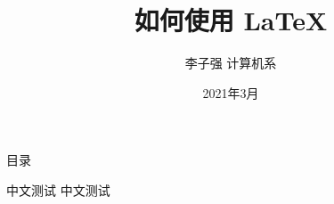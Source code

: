 \documentclass{libs/SUSTech_format}
\title[如何使用 \LaTeX]{\huge \textbf{ 如何使用 \LaTeX}}
\author{李子强 \enskip 计算机系}
\institute{\raggedleft 南方科技大学图书馆}
\date{2021年3月}
\begin{document}



{
    \begin{frame}
    \maketitle
    \end{frame}
}

\begin{frame}{目录}
    \begin{multicols}{2}
        \tableofcontents
    \end{multicols}
\end{frame}

\begin{frame}{中文测试}
    中文测试\end{frame}


\end{document}
